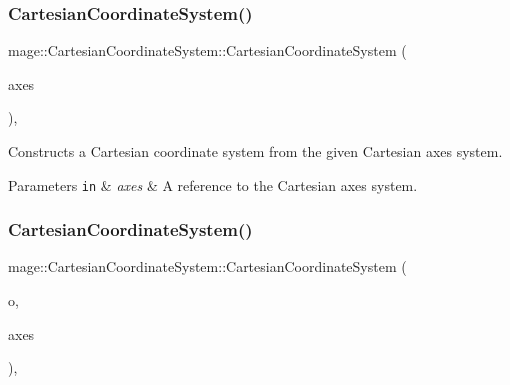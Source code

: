 \subsubsection{\texorpdfstring{Cartesian\+Coordinate\+System()}{CartesianCoordinateSystem()}\hspace{0.1cm}{\footnotesize\ttfamily [1/4]}}
{\footnotesize\ttfamily mage\+::\+Cartesian\+Coordinate\+System\+::\+Cartesian\+Coordinate\+System (\begin{DoxyParamCaption}\item[{const \hyperlink{structmage_1_1_cartesian_axes_system}{Cartesian\+Axes\+System} \&}]{axes }\end{DoxyParamCaption})\hspace{0.3cm}{\ttfamily [explicit]}, {\ttfamily [noexcept]}}

Constructs a Cartesian coordinate system from the given Cartesian axes system.


\begin{DoxyParams}[1]{Parameters}
\mbox{\tt in}  & {\em axes} & A reference to the Cartesian axes system. \\
\hline
\end{DoxyParams}
\hypertarget{structmage_1_1_cartesian_coordinate_system_a0ee3d1c8cddf4eee1cebef32b2112a53}{}\label{structmage_1_1_cartesian_coordinate_system_a0ee3d1c8cddf4eee1cebef32b2112a53} 
\subsubsection{\texorpdfstring{Cartesian\+Coordinate\+System()}{CartesianCoordinateSystem()}\hspace{0.1cm}{\footnotesize\ttfamily [2/4]}}
{\footnotesize\ttfamily mage\+::\+Cartesian\+Coordinate\+System\+::\+Cartesian\+Coordinate\+System (\begin{DoxyParamCaption}\item[{F\+X\+M\+V\+E\+C\+T\+OR}]{o,  }\item[{const \hyperlink{structmage_1_1_cartesian_axes_system}{Cartesian\+Axes\+System} \&}]{axes }\end{DoxyParamCaption})\hspace{0.3cm}{\ttfamily [explicit]}, {\ttfamily [noexcept]}}

